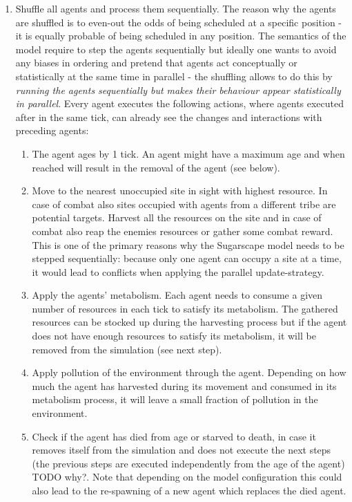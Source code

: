\begin{enumerate}
	\item Shuffle all agents and process them sequentially. The reason why the agents are shuffled is to even-out the odds of being scheduled at a specific position - it is equally probable of being scheduled in any position. The semantics of the model require to step the agents sequentially but ideally one wants to avoid any biases in ordering and pretend that agents act conceptually or statistically at the same time in parallel - the shuffling allows to do this by \textit{running the agents sequentially but makes their behaviour appear statistically in parallel}. Every agent executes the following actions, where agents executed after in the same tick, can already see the changes and interactions with preceding agents:
	
	\begin{enumerate}
		\item The agent ages by 1 tick. An agent might have a maximum age and when reached will result in the removal of the agent (see below).
	
		\item Move to the nearest unoccupied site in sight with highest resource. In case of combat also sites occupied with agents from a different tribe are potential targets. Harvest all the resources on the site and in case of combat also reap the enemies resources or gather some combat reward. This is one of the primary reasons why the Sugarscape model needs to be stepped sequentially: because only one agent can occupy a site at a time, it would lead to conflicts when applying the parallel update-strategy.

		\item Apply the agents' metabolism. Each agent needs to consume a given number of resources in each tick to satisfy its metabolism. The gathered resources can be stocked up during the harvesting process but if the agent does not have enough resources to satisfy its metabolism, it will be removed from the simulation (see next step).
		
		\item Apply pollution of the environment through the agent. Depending on how much the agent has harvested during its movement and consumed in its metabolism process, it will leave a small fraction of pollution in the environment.
		
		\item Check if the agent has died from age or starved to death, in case it removes itself from the simulation and does not execute the next steps (the previous steps are executed independently from the age of the agent) TODO why?. Note that depending on the model configuration this could also lead to the re-spawning of a new agent which replaces the died agent.
		

\end{enumerate}
\end{enumerate}
